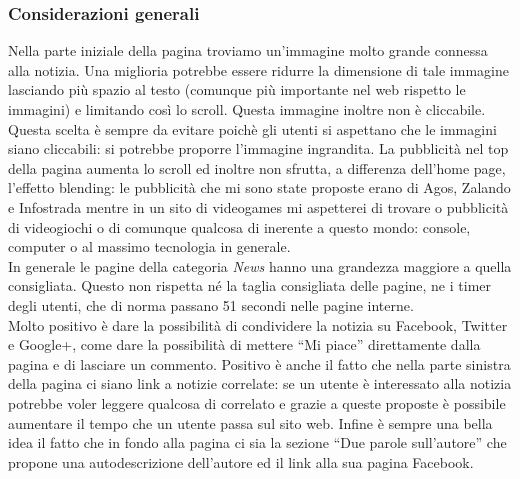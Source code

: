 \documentclass[../ProgettoTecWeb2.tex]{subfiles}
\begin{document}
		\subsubsection{Considerazioni generali}
		Nella parte iniziale della pagina troviamo un'immagine molto grande connessa alla notizia. Una miglioria potrebbe essere ridurre la dimensione di tale immagine lasciando più spazio al testo (comunque più importante nel web rispetto le immagini) e limitando così lo scroll. Questa immagine inoltre non è cliccabile. Questa scelta è sempre da evitare poichè gli utenti si aspettano che le immagini siano cliccabili: si potrebbe proporre l'immagine ingrandita. La pubblicità nel top della pagina aumenta lo scroll ed inoltre non sfrutta, a differenza dell'home page, l'effetto blending: le pubblicità che mi sono state proposte erano di Agos, Zalando e Infostrada mentre in un sito di videogames mi aspetterei di trovare o pubblicità di videogiochi o di comunque qualcosa di inerente a questo mondo: console, computer o al massimo tecnologia in generale. \\

		In generale le pagine della categoria \textit{News} hanno una grandezza maggiore a quella consigliata. Questo non rispetta né la taglia consigliata delle pagine, ne i timer degli utenti, che di norma passano 51 secondi nelle pagine interne. \\

		Molto positivo è dare la possibilità di condividere la notizia su Facebook, Twitter e Google+, come dare la possibilità di mettere ``Mi piace'' direttamente dalla pagina e di lasciare un commento. Positivo è anche il fatto che nella parte sinistra della pagina ci siano link a notizie correlate: se un utente è interessato alla notizia potrebbe voler leggere qualcosa di correlato e grazie a queste proposte è possibile aumentare il tempo che un utente passa sul sito web. Infine è sempre una bella idea il fatto che in fondo alla pagina ci sia la sezione ``Due parole sull'autore'' che propone una autodescrizione dell'autore ed il link alla sua pagina Facebook.

	\newpage
\end{document}
